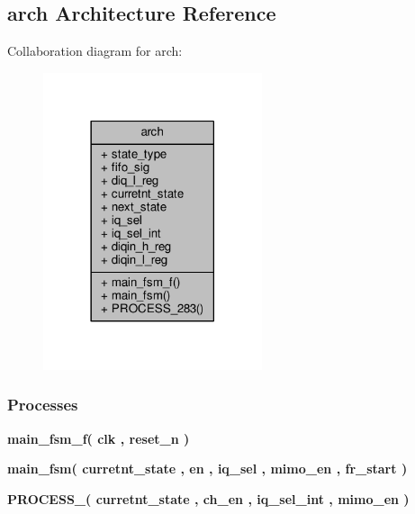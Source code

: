 \subsection{arch Architecture Reference}
\label{classwr__rx__fifo__v3_1_1arch}


Collaboration diagram for arch\+:\nopagebreak
\begin{figure}[H]
\begin{center}
\leavevmode
\includegraphics[width=182pt]{d2/dbf/classwr__rx__fifo__v3_1_1arch__coll__graph}
\end{center}
\end{figure}
\subsubsection*{Processes}
 \begin{DoxyCompactItemize}
\item 
{\bf main\+\_\+fsm\+\_\+f}{\bfseries  ( {\bfseries {\bfseries {\bf clk}} \textcolor{vhdlchar}{ }} , {\bfseries {\bfseries {\bf reset\+\_\+n}} \textcolor{vhdlchar}{ }} )}
\item 
{\bf main\+\_\+fsm}{\bfseries  ( {\bfseries {\bfseries {\bf curretnt\+\_\+state}} \textcolor{vhdlchar}{ }} , {\bfseries {\bfseries {\bf en}} \textcolor{vhdlchar}{ }} , {\bfseries {\bfseries {\bf iq\+\_\+sel}} \textcolor{vhdlchar}{ }} , {\bfseries {\bfseries {\bf mimo\+\_\+en}} \textcolor{vhdlchar}{ }} , {\bfseries {\bfseries {\bf fr\+\_\+start}} \textcolor{vhdlchar}{ }} )}
\item 
{\bf P\+R\+O\+C\+E\+S\+S\+\_}{\bfseries  ( {\bfseries {\bfseries {\bf curretnt\+\_\+state}} \textcolor{vhdlchar}{ }} , {\bfseries {\bfseries {\bf ch\+\_\+en}} \textcolor{vhdlchar}{ }} , {\bfseries {\bfseries {\bf iq\+\_\+sel\+\_\+int}} \textcolor{vhdlchar}{ }} , {\bfseries {\bfseries {\bf mimo\+\_\+en}} \textcolor{vhdlchar}{ }} )}
\end{DoxyCompactItemize}
